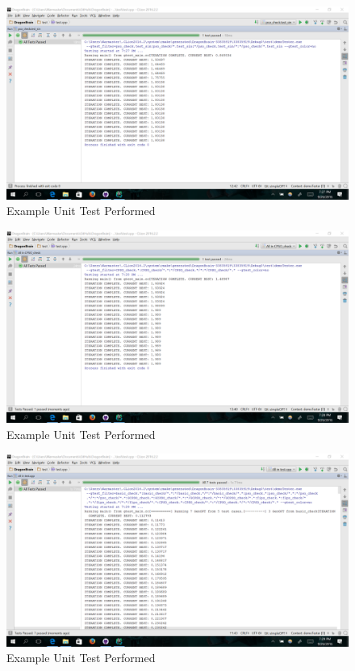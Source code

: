 \documentclass[11pt]{article}
\begin{document}
\begin{figure}[h]
\includegraphics[scale=0.2]{psoTest.png}
\caption{Example Unit Test Performed}
\end{figure}
\begin{figure}[h]
\includegraphics[scale=0.2]{cPSOcheck.png}
\caption{Example Unit Test Performed}
\end{figure}
\begin{figure}[h]
\includegraphics[scale=0.2]{hillClimbTest.png}
\caption{Example Unit Test Performed}
\end{figure}
\end{document}
